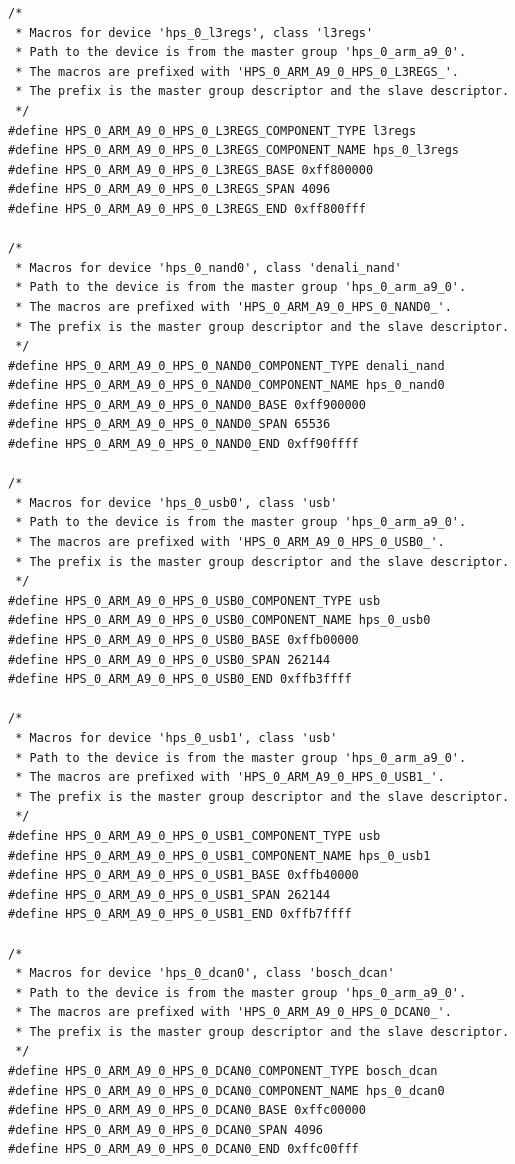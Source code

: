 \documentclass[conference]{IEEEtran}
\begin{document}
\begin{lstlisting}
/*
 * Macros for device 'hps_0_l3regs', class 'l3regs'
 * Path to the device is from the master group 'hps_0_arm_a9_0'.
 * The macros are prefixed with 'HPS_0_ARM_A9_0_HPS_0_L3REGS_'.
 * The prefix is the master group descriptor and the slave descriptor.
 */
#define HPS_0_ARM_A9_0_HPS_0_L3REGS_COMPONENT_TYPE l3regs
#define HPS_0_ARM_A9_0_HPS_0_L3REGS_COMPONENT_NAME hps_0_l3regs
#define HPS_0_ARM_A9_0_HPS_0_L3REGS_BASE 0xff800000
#define HPS_0_ARM_A9_0_HPS_0_L3REGS_SPAN 4096
#define HPS_0_ARM_A9_0_HPS_0_L3REGS_END 0xff800fff

/*
 * Macros for device 'hps_0_nand0', class 'denali_nand'
 * Path to the device is from the master group 'hps_0_arm_a9_0'.
 * The macros are prefixed with 'HPS_0_ARM_A9_0_HPS_0_NAND0_'.
 * The prefix is the master group descriptor and the slave descriptor.
 */
#define HPS_0_ARM_A9_0_HPS_0_NAND0_COMPONENT_TYPE denali_nand
#define HPS_0_ARM_A9_0_HPS_0_NAND0_COMPONENT_NAME hps_0_nand0
#define HPS_0_ARM_A9_0_HPS_0_NAND0_BASE 0xff900000
#define HPS_0_ARM_A9_0_HPS_0_NAND0_SPAN 65536
#define HPS_0_ARM_A9_0_HPS_0_NAND0_END 0xff90ffff

/*
 * Macros for device 'hps_0_usb0', class 'usb'
 * Path to the device is from the master group 'hps_0_arm_a9_0'.
 * The macros are prefixed with 'HPS_0_ARM_A9_0_HPS_0_USB0_'.
 * The prefix is the master group descriptor and the slave descriptor.
 */
#define HPS_0_ARM_A9_0_HPS_0_USB0_COMPONENT_TYPE usb
#define HPS_0_ARM_A9_0_HPS_0_USB0_COMPONENT_NAME hps_0_usb0
#define HPS_0_ARM_A9_0_HPS_0_USB0_BASE 0xffb00000
#define HPS_0_ARM_A9_0_HPS_0_USB0_SPAN 262144
#define HPS_0_ARM_A9_0_HPS_0_USB0_END 0xffb3ffff

/*
 * Macros for device 'hps_0_usb1', class 'usb'
 * Path to the device is from the master group 'hps_0_arm_a9_0'.
 * The macros are prefixed with 'HPS_0_ARM_A9_0_HPS_0_USB1_'.
 * The prefix is the master group descriptor and the slave descriptor.
 */
#define HPS_0_ARM_A9_0_HPS_0_USB1_COMPONENT_TYPE usb
#define HPS_0_ARM_A9_0_HPS_0_USB1_COMPONENT_NAME hps_0_usb1
#define HPS_0_ARM_A9_0_HPS_0_USB1_BASE 0xffb40000
#define HPS_0_ARM_A9_0_HPS_0_USB1_SPAN 262144
#define HPS_0_ARM_A9_0_HPS_0_USB1_END 0xffb7ffff

/*
 * Macros for device 'hps_0_dcan0', class 'bosch_dcan'
 * Path to the device is from the master group 'hps_0_arm_a9_0'.
 * The macros are prefixed with 'HPS_0_ARM_A9_0_HPS_0_DCAN0_'.
 * The prefix is the master group descriptor and the slave descriptor.
 */
#define HPS_0_ARM_A9_0_HPS_0_DCAN0_COMPONENT_TYPE bosch_dcan
#define HPS_0_ARM_A9_0_HPS_0_DCAN0_COMPONENT_NAME hps_0_dcan0
#define HPS_0_ARM_A9_0_HPS_0_DCAN0_BASE 0xffc00000
#define HPS_0_ARM_A9_0_HPS_0_DCAN0_SPAN 4096
#define HPS_0_ARM_A9_0_HPS_0_DCAN0_END 0xffc00fff


\end{lstlisting}
\end{document}

